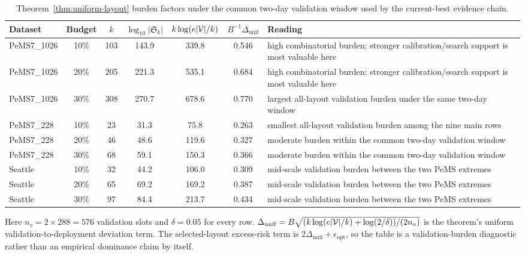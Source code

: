 \begin{table}[pos=htbp]
\centering
\caption{Theorem~\ref{thm:uniform-layout} burden factors under the common two-day validation window used by the current-best evidence chain.}
\label{tab:trace-biopt-generalization-burden}
\scriptsize
\begin{tabularx}{\textwidth}{lccccc>{\raggedright\arraybackslash}X}
\toprule
Dataset & Budget & $k$ & $\log_{10}|\mathfrak{S}_k|$ & $k\log(e|\mathcal{V}|/k)$ & $B^{-1}\Delta_{\mathrm{unif}}$ & Reading \\
\midrule
PeMS7\_1026 & 10\% & 103 & 143.9 & 339.8 & 0.546 & high combinatorial burden; stronger calibration/search support is most valuable here \\
PeMS7\_1026 & 20\% & 205 & 221.3 & 535.1 & 0.684 & high combinatorial burden; stronger calibration/search support is most valuable here \\
PeMS7\_1026 & 30\% & 308 & 270.7 & 678.6 & 0.770 & largest all-layout validation burden under the same two-day window \\
PeMS7\_228 & 10\% & 23 & 31.3 & 75.8 & 0.263 & smallest all-layout validation burden among the nine main rows \\
PeMS7\_228 & 20\% & 46 & 48.6 & 119.6 & 0.327 & moderate burden within the common two-day validation window \\
PeMS7\_228 & 30\% & 68 & 59.1 & 150.3 & 0.366 & moderate burden within the common two-day validation window \\
Seattle & 10\% & 32 & 44.2 & 106.0 & 0.309 & mid-scale validation burden between the two PeMS extremes \\
Seattle & 20\% & 65 & 69.2 & 169.2 & 0.387 & mid-scale validation burden between the two PeMS extremes \\
Seattle & 30\% & 97 & 84.4 & 213.7 & 0.434 & mid-scale validation burden between the two PeMS extremes \\
\bottomrule
\end{tabularx}
\begin{flushleft}\footnotesize Here $n_v=2\times 288=576$ validation slots and $\delta=0.05$ for every row. $\Delta_{\mathrm{unif}}=B\sqrt{(k\log(e|\mathcal{V}|/k)+\log(2/\delta))/(2n_v)}$ is the theorem's uniform validation-to-deployment deviation term. The selected-layout excess-risk term is $2\Delta_{\mathrm{unif}}+\epsilon_{\mathrm{opt}}$, so the table is a validation-burden diagnostic rather than an empirical dominance claim by itself.\end{flushleft}
\end{table}
